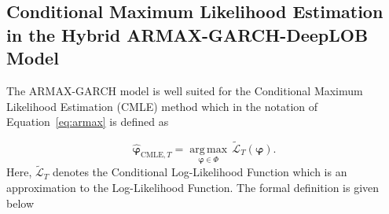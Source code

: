 \documentclass{rQUF2e}
\theoremstyle{plain}
\theoremstyle{definition}
\theoremstyle{remark}
\begin{document}
\subsection{Conditional Maximum Likelihood Estimation in the Hybrid ARMAX-GARCH-DeepLOB Model}
\label{subsec:cmle_props_paper}
The ARMAX-GARCH model is well suited for the Conditional Maximum Likelihood Estimation (CMLE) method which in the notation of Equation~\eqref{eq:armax} is defined as

$$
    \hat{\boldsymbol{\varphi}}_{\mathrm{CMLE}, T} = \underset{\boldsymbol{\varphi} \in \Phi}{\operatorname{arg\,max}} \, \tilde{\mathcal{L}}_{T}(\boldsymbol{\varphi}).
$$
Here, $\tilde{\mathcal{L}}_{T}$ denotes the Conditional Log-Likelihood Function which is an approximation to the Log-Likelihood Function. The formal definition is given below
\end{document}
